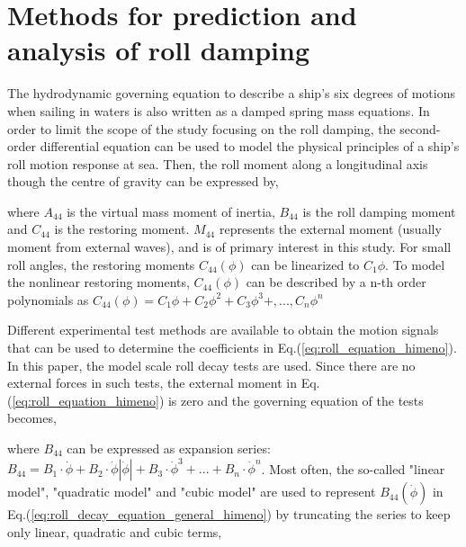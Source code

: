 \section{Methods for prediction and analysis of roll damping}
\label{se:methods_for_prediction_and_analysis}
The hydrodynamic governing equation to describe a ship's six degrees of motions when sailing in waters is also written as a damped spring mass equations. In order to limit the scope of the study focusing on the roll damping, the second-order differential equation can be used to model the physical principles of a ship's roll motion response at sea. Then, the roll moment along a longitudinal axis though the centre of gravity can be expressed by,

 

where $A_{44}$ is the virtual mass moment of inertia, $B_{44}$ is the roll damping moment and $C_{44}$ is the restoring moment. $M_{44}$ represents the external moment (usually moment from external waves), and is of primary interest in this study. For small roll angles, the restoring moments $C_{44}(\phi)$ can be linearized to $C_{1}\phi$. To model the nonlinear restoring moments, $C_{44}(\phi)$ can be described by a n-th order polynomials as $C_{44}(\phi) = C_{1}\phi + C_{2}\phi^2 + C_{3}\phi^3 +, ..., C_{n}\phi^n $

Different experimental test methods are available to obtain the motion signals that can be used to determine the coefficients in Eq.(\ref{eq:roll_equation_himeno}). In this paper, the model scale roll decay tests are used. Since there are no external forces in such tests, the external moment in Eq.(\ref{eq:roll_equation_himeno}) is zero and the governing equation of the tests becomes, 




where $B_{44}$ can be expressed as expansion series:  
$ B_{44} = B_1\cdot\dot{\phi} + B_2\cdot\dot{\phi}\left|\dot{\phi}\right| + B_3\cdot\dot{\phi}^3 + ... + B_n\cdot\dot{\phi}^n$. Most often, the so-called "linear model", "quadratic model" and "cubic model" are used to represent $B_{44}(\dot{\phi})$ in Eq.(\ref{eq:roll_decay_equation_general_himeno}) by truncating the series to keep only linear, quadratic and cubic terms,

